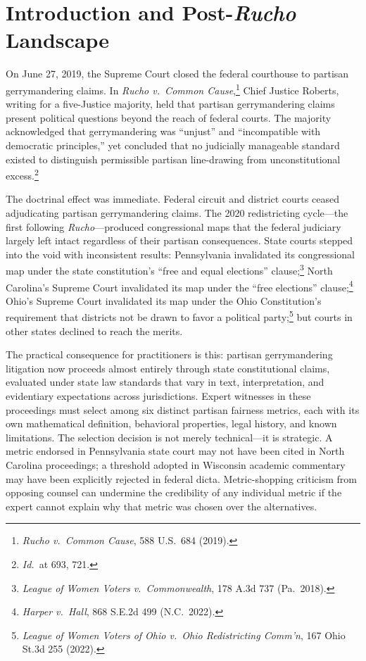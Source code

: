 \section{Introduction and Post-\textit{Rucho} Landscape}
\label{sec:introduction}

On June 27, 2019, the Supreme Court closed the federal courthouse to partisan gerrymandering claims.
In \textit{Rucho v.\ Common Cause},\footnote{\textit{Rucho v.\ Common Cause}, 588 U.S.\ 684 (2019).}
Chief Justice Roberts, writing for a five-Justice majority, held that partisan gerrymandering
claims present political questions beyond the reach of federal courts. The majority acknowledged
that gerrymandering was ``unjust'' and ``incompatible with democratic principles,'' yet concluded
that no judicially manageable standard existed to distinguish permissible partisan line-drawing
from unconstitutional excess.\footnote{\textit{Id.}\ at 693, 721.}

The doctrinal effect was immediate. Federal circuit and district courts ceased adjudicating
partisan gerrymandering claims. The 2020 redistricting cycle---the first following
\textit{Rucho}---produced congressional maps that the federal judiciary largely left intact
regardless of their partisan consequences. State courts stepped into the void with
inconsistent results: Pennsylvania invalidated its congressional map under the state
constitution's ``free and equal elections'' clause;\footnote{\textit{League of Women Voters
v.\ Commonwealth}, 178 A.3d 737 (Pa.\ 2018).} North Carolina's Supreme Court invalidated
its map under the ``free elections'' clause;\footnote{\textit{Harper v.\ Hall}, 868 S.E.2d
499 (N.C.\ 2022).} Ohio's Supreme Court invalidated its map under the Ohio Constitution's
requirement that districts not be drawn to favor a political party;\footnote{\textit{League
of Women Voters of Ohio v.\ Ohio Redistricting Comm'n}, 167 Ohio St.3d 255 (2022).}
but courts in other states declined to reach the merits.

The practical consequence for practitioners is this: partisan gerrymandering litigation
now proceeds almost entirely through state constitutional claims, evaluated under state
law standards that vary in text, interpretation, and evidentiary expectations across
jurisdictions. Expert witnesses in these proceedings must select among six distinct
partisan fairness metrics, each with its own mathematical definition, behavioral properties,
legal history, and known limitations. The selection decision is not merely technical---it
is strategic. A metric endorsed in Pennsylvania state court may not have been cited in
North Carolina proceedings; a threshold adopted in Wisconsin academic commentary may
have been explicitly rejected in federal dicta. Metric-shopping criticism from opposing
counsel can undermine the credibility of any individual metric if the expert cannot
explain why that metric was chosen over the alternatives.


